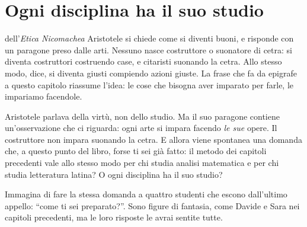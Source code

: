 \chapter{Ogni disciplina ha il suo studio}
\label{cap:discipline}


 dell'\emph{Etica Nicomachea} Aristotele
si chiede come si diventi buoni, e risponde con un paragone preso dalle
arti. Nessuno nasce costruttore o suonatore di cetra: si diventa
costruttori costruendo case, e citaristi suonando la cetra. Allo stesso
modo, dice, si diventa giusti compiendo azioni giuste. La frase che fa
da epigrafe a questo capitolo riassume l'idea: le cose che bisogna aver
imparato per farle, le impariamo facendole.

Aristotele parlava della virtù, non dello studio. Ma il suo paragone
contiene un'osservazione che ci riguarda: ogni arte si impara facendo
\emph{le sue} opere. Il costruttore non impara suonando la cetra. E
allora viene spontanea una domanda che, a questo punto del libro, forse
ti sei già fatto: il metodo dei capitoli precedenti vale allo stesso
modo per chi studia analisi matematica e per chi studia letteratura
latina? O ogni disciplina ha il suo studio?

Immagina di fare la stessa domanda a quattro studenti che escono
dall'ultimo appello: \enquote{come ti sei preparato?}. Sono figure di
fantasia, come Davide e Sara nei capitoli precedenti, ma le loro
risposte le avrai sentite tutte.

